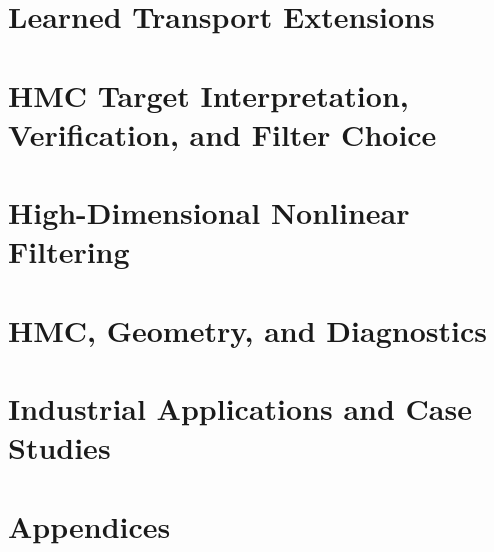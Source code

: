 \documentclass[12pt,a4paper,openany]{book}
\begin{document}
\part{Learned Transport Extensions}




\part{HMC Target Interpretation, Verification, and Filter Choice}




\part{High-Dimensional Nonlinear Filtering}









\part{HMC, Geometry, and Diagnostics}







\part{Industrial Applications and Case Studies}







\appendix
\part*{Appendices}








\backmatter


\end{document}
